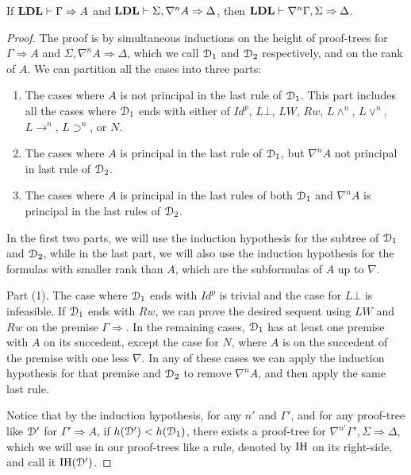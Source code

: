 \begin{thm}
  If $\mathbf{LDL} \vdash \Gamma \Rightarrow A$ and $\mathbf{LDL} \vdash \Sigma, \nabla^n A \Rightarrow \Delta$, then $\mathbf{LDL} \vdash \nabla^n \Gamma, \Sigma \Rightarrow \Delta$.
\end{thm}
\begin{proof}
  The proof is by simultaneous inductions on the height of proof-trees for $\Gamma \Rightarrow A$ and $\Sigma, \nabla^n A \Rightarrow \Delta$, which we call $\mathcal{D}_1$ and $\mathcal{D}_2$ respectively, and on the rank of $A$. We can partition all the cases into three parts:
  \begin{enumerate}
    \item The cases where $A$ is not principal in the last rule of $\mathcal{D}_1$. This part includes all the cases where $\mathcal{D}_1$ ends with either of $Id^p$, $L \bot$, $LW$, $Rw$, $L \wedge ^n$, $L \vee ^n$, $L \rightarrow ^n$, $L \supset ^n$, or $N$.

    \item The cases where $A$ is principal in the last rule of $\mathcal{D}_1$, but $\nabla^n A$ not principal in last rule of $\mathcal{D}_2$.

    \item The cases where $A$ is principal in the last rules of both $\mathcal{D}_1$ and $\nabla^n A$ is principal in the last rules of $\mathcal{D}_2$.
  \end{enumerate}
  In the first two parts, we will use the induction hypothesis for the subtree of $\mathcal{D}_1$ and $\mathcal{D}_2$, while in the last part, we will also use the induction hypothesis for the formulas with smaller rank than $A$, which are the subformulas of $A$ up to $\nabla$.

  Part (1). The case where $\mathcal{D}_1$ ends with $Id^p$ is trivial and the case for $L \bot$ is infeasible. If $\mathcal{D}_1$ ends with $Rw$, we can prove the desired sequent using $LW$ and $Rw$ on the premise $\Gamma \Rightarrow$. In the remaining cases, $\mathcal{D}_1$ has at least one premise with $A$ on its succedent, except the case for $N$, where $A$ is on the succedent of the premise with one less $\nabla$. In any of these cases we can apply the induction hypothesis for that premise and $\mathcal{D}_2$ to remove $\nabla^n A$, and then apply the same last rule.

  Notice that by the induction hypothesis, for any $n'$ and $\Gamma'$, and for any proof-tree like $\mathcal{D}'$ for $\Gamma' \Rightarrow A$, if $h(\mathcal{D}') < h(\mathcal{D}_1)$, there exists a proof-tree for $\nabla^{n'} \Gamma', \Sigma \Rightarrow \Delta$, which we will use in our proof-trees like a rule, denoted by $\mathrm{IH}$ on its right-side, and call it $\mathrm{IH}(\mathcal{D}')$.


\end{proof}
